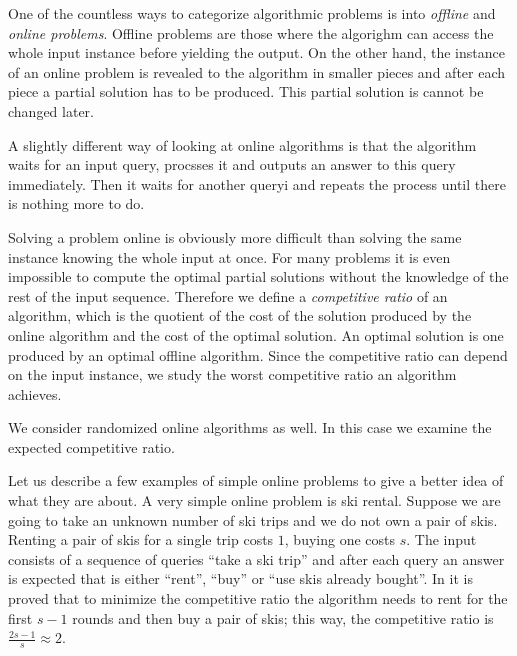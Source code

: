 One of the countless ways to categorize algorithmic problems is into
\emph{offline} and \emph{online problems}. Offline problems are those
where the algorighm can access the whole input instance before yielding
the output.  On the other hand, the instance of an online problem is
revealed to the algorithm in smaller pieces and after each piece a partial
solution has to be produced. This partial solution is cannot be changed
later.

A slightly different way of looking at online algorithms is that the
algorithm waits for an input query, procsses it and outputs an answer to
this query immediately. Then it waits for another queryi and repeats the
process until there is nothing more to do.

Solving a problem online is obviously more difficult than solving the same
instance knowing the whole input at once. For many problems it is even
impossible to compute the optimal partial solutions without the knowledge
of the rest of the input sequence. Therefore we define a \emph{competitive
ratio} of an algorithm, which is the quotient of the cost of the solution
produced by the online algorithm and the cost of the optimal solution. An
optimal solution is one produced by an optimal offline algorithm. Since
the competitive ratio can depend on the input instance, we study the worst
competitive ratio an algorithm achieves.

We consider randomized online algorithms as well. In this case we examine
the expected competitive ratio.

Let us describe a few examples of simple online problems to give a better
idea of what they are about. A very simple online problem is ski rental.
Suppose we are going to take an unknown number of ski trips and we do not
own a pair of skis. Renting a pair of skis for a single trip costs $1$,
buying one costs $s$. The input consists of a sequence of queries ``take a
ski trip'' and after each query an answer is expected that is either
``rent'', ``buy'' or ``use skis already bought''. In \cite{skirental} it
is proved that to minimize the competitive ratio the algorithm needs to
rent for the first $s-1$ rounds and then buy a pair of skis; this way, the
competitive ratio is $\frac{2s-1}{s} \approx 2$.
